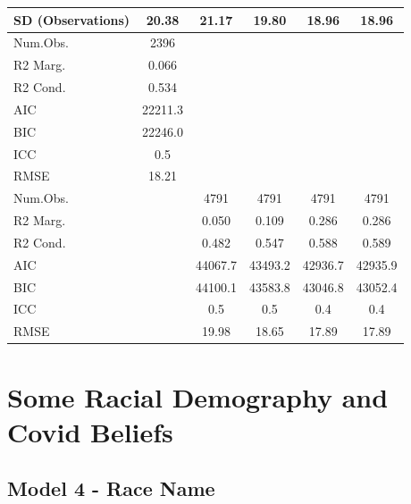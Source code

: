 \documentclass[]{report}
\begin{document}
\begin{table}
{\begin{tabular}[t]{lccccc}
		SD (Observations) & \num{20.38} & \num{21.17} & \num{19.80} & \num{18.96} & \num{18.96}\\
		\midrule
		Num.Obs. & \num{2396} & &&&\\
		R2 Marg. & \num{0.066} & &&&\\
		R2 Cond. & \num{0.534} & &&&\\
		AIC & \num{22211.3} & &&&\\
		BIC & \num{22246.0} & &&&\\
		ICC & \num{0.5} &&&&\\
		RMSE & \num{18.21} & &&&\\
		\midrule
		Num.Obs. &  & \num{4791} & \num{4791} & \num{4791} & \num{4791}\\
		R2 Marg. &  & \num{0.050} & \num{0.109} & \num{0.286} & \num{0.286}\\
		R2 Cond. & & \num{0.482} & \num{0.547} & \num{0.588} & \num{0.589}\\
		AIC & & \num{44067.7} & \num{43493.2} & \num{42936.7} & \num{42935.9}\\
		BIC &  & \num{44100.1} & \num{43583.8} & \num{43046.8} & \num{43052.4}\\
		ICC &  & \num{0.5} & \num{0.5} & \num{0.4} & \num{0.4}\\
		RMSE &  & \num{19.98} & \num{18.65} & \num{17.89} & \num{17.89}\\
		\bottomrule
	\end{tabular}}
\end{table}



\part{Some Racial Demography and Covid Beliefs}

\chapter{Model 4 - Race Name}
\end{document}

